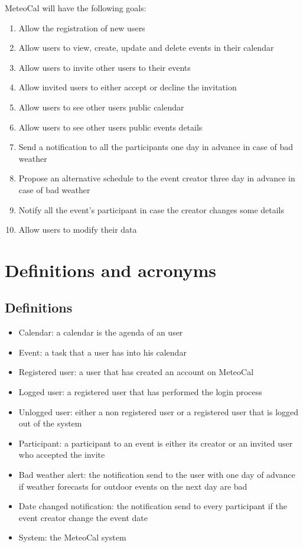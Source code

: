 \documentclass[10pt,a4paper,titlepage]{article}
\begin{document}
MeteoCal will have the following goals:
\begin{enumerate}[label = G\arabic*:]
\item Allow the registration of new users
\item Allow users to view, create, update and delete events in their calendar
\item Allow users to invite other users to their events
\item Allow invited users to either accept or decline the invitation
\item Allow users to see other users public calendar
\item Allow users to see other users public events details
\item Send a notification to all the participants one day in advance in case of bad weather
\item Propose an alternative schedule to the event creator three day in advance in case of bad weather
\item Notify all the event's participant in case the creator changes some details
\item Allow users to modify their data
\end{enumerate}
\section{Definitions and acronyms}

\subsection{Definitions}
\begin{itemize}
\item Calendar: a calendar is the agenda of an user
\item Event: a task that a user has into his calendar
\item Registered user: a user that has created an account on MeteoCal
\item Logged user: a registered user that has performed the login process
\item Unlogged user: either a non registered user or a registered user that is logged out of the system
\item Participant: a participant to an event is either its creator or an invited user who accepted the invite
\item Bad weather alert: the notification send to the user with one day of advance if weather forecasts for outdoor events on the next day are bad
\item Date changed notification: the notification send to every participant if the event creator change the event date
\item System: the MeteoCal system
\end{itemize}
\end{document}
